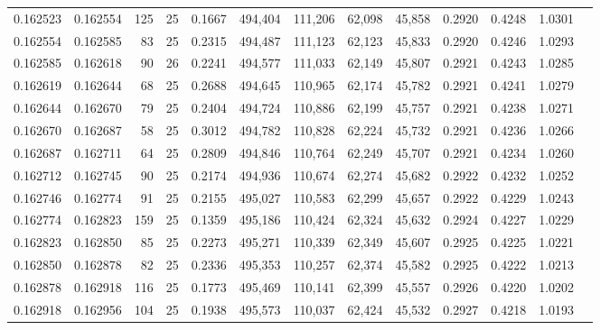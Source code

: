 \begin{tabular}{rrrrrrrrrrrrr}
0.162523 & 0.162554 &   125 &  25 &                                     0.1667 & 494,404 & 111,206 &  62,098 &  45,858 & 0.2920 & 0.4248 & 1.0301 \\
0.162554 & 0.162585 &    83 &  25 &                                     0.2315 & 494,487 & 111,123 &  62,123 &  45,833 & 0.2920 & 0.4246 & 1.0293 \\
0.162585 & 0.162618 &    90 &  26 &                                     0.2241 & 494,577 & 111,033 &  62,149 &  45,807 & 0.2921 & 0.4243 & 1.0285 \\
0.162619 & 0.162644 &    68 &  25 &                                     0.2688 & 494,645 & 110,965 &  62,174 &  45,782 & 0.2921 & 0.4241 & 1.0279 \\
0.162644 & 0.162670 &    79 &  25 &                                     0.2404 & 494,724 & 110,886 &  62,199 &  45,757 & 0.2921 & 0.4238 & 1.0271 \\
0.162670 & 0.162687 &    58 &  25 &                                     0.3012 & 494,782 & 110,828 &  62,224 &  45,732 & 0.2921 & 0.4236 & 1.0266 \\
0.162687 & 0.162711 &    64 &  25 &                                     0.2809 & 494,846 & 110,764 &  62,249 &  45,707 & 0.2921 & 0.4234 & 1.0260 \\
0.162712 & 0.162745 &    90 &  25 &                                     0.2174 & 494,936 & 110,674 &  62,274 &  45,682 & 0.2922 & 0.4232 & 1.0252 \\
0.162746 & 0.162774 &    91 &  25 &                                     0.2155 & 495,027 & 110,583 &  62,299 &  45,657 & 0.2922 & 0.4229 & 1.0243 \\
0.162774 & 0.162823 &   159 &  25 &                                     0.1359 & 495,186 & 110,424 &  62,324 &  45,632 & 0.2924 & 0.4227 & 1.0229 \\
0.162823 & 0.162850 &    85 &  25 &                                     0.2273 & 495,271 & 110,339 &  62,349 &  45,607 & 0.2925 & 0.4225 & 1.0221 \\
0.162850 & 0.162878 &    82 &  25 &                                     0.2336 & 495,353 & 110,257 &  62,374 &  45,582 & 0.2925 & 0.4222 & 1.0213 \\
0.162878 & 0.162918 &   116 &  25 &                                     0.1773 & 495,469 & 110,141 &  62,399 &  45,557 & 0.2926 & 0.4220 & 1.0202 \\
0.162918 & 0.162956 &   104 &  25 &                                     0.1938 & 495,573 & 110,037 &  62,424 &  45,532 & 0.2927 & 0.4218 & 1.0193 \\

\end{tabular}
